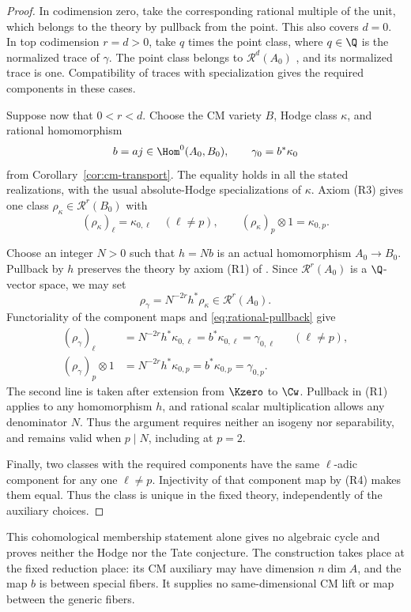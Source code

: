 \begin{proof}
In codimension zero, take the corresponding rational multiple of the
unit, which belongs to the theory by pullback from the point.  This
also covers $d=0$.  In top codimension $r=d>0$, take $q$ times the
point class, where $q\in\Q$ is the normalized trace of $\gamma$.
The point class belongs to $\mathcal R^d(A_0)$
\cite[\S2.3]{Milne2009}, and its normalized trace is one.  Compatibility
of traces with specialization gives the required components in these
cases.

Suppose now that $0<r<d$.  Choose the CM variety $B$, Hodge class
$\kappa$, and rational homomorphism
\[
 b=aj\in\Hom^0(A_0,B_0),\qquad
 \gamma_0=b^*\kappa_0
\]
from Corollary~\ref{cor:cm-transport}.  The equality holds in all
the stated realizations, with the usual absolute-Hodge specializations
of $\kappa$.  Axiom \textup{(R3)} gives one class
\(\rho_\kappa\in\mathcal R^r(B_0)\) with
\[
 (\rho_\kappa)_\ell=\kappa_{0,\ell}\quad(\ell\ne p),\qquad
 (\rho_\kappa)_p\otimes1=\kappa_{0,p}.
\]

Choose an integer \(N>0\) such that \(h=Nb\) is an actual
homomorphism \(A_0\to B_0\). Pullback by \(h\) preserves the theory
by axiom \textup{(R1)} of \cite[Definition~2.1]{Milne2009}. Since
\(\mathcal R^r(A_0)\) is a \(\Q\)-vector space, we may set
\[
 \rho_\gamma=N^{-2r}h^*\rho_\kappa\in\mathcal R^r(A_0).
\]
Functoriality of the component maps and
\eqref{eq:rational-pullback} give
\begin{align*}
 (\rho_\gamma)_\ell
   &=N^{-2r}h^*\kappa_{0,\ell}
     =b^*\kappa_{0,\ell}=\gamma_{0,\ell}
       &&(\ell\ne p),\\
 (\rho_\gamma)_p\otimes1
   &=N^{-2r}h^*\kappa_{0,p}
     =b^*\kappa_{0,p}=\gamma_{0,p}.
\end{align*}
The second line is taken after extension from $\Kzero$ to $\Cw$.
Pullback in \textup{(R1)} applies to any homomorphism $h$, and rational
scalar multiplication allows any denominator $N$.  Thus the argument
requires neither an isogeny nor separability, and remains valid when
$p\mid N$, including at $p=2$.

Finally, two classes with the required components have the same
\(\ell\)-adic component for any one \(\ell\ne p\). Injectivity of
that component map by \textup{(R4)} makes them equal. Thus the class
is unique in the fixed theory, independently of the auxiliary choices.
\end{proof}

This cohomological membership statement alone gives no algebraic cycle
and proves neither the Hodge nor the Tate conjecture.  The construction
takes place at the fixed
reduction place: its CM auxiliary may have dimension $n\dim A$, and
the map $b$ is between special fibers.  It supplies no same-dimensional
CM lift or map between the generic fibers.

